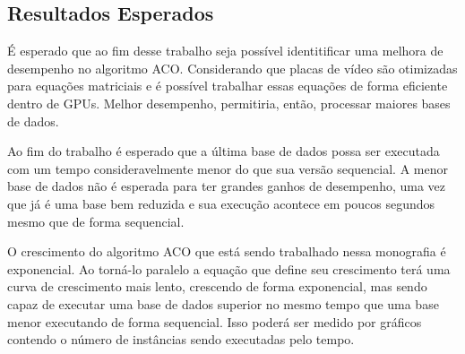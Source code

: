 \subsection{Resultados Esperados} \label{resultadosEsperados}

É esperado que ao fim desse trabalho seja possível identitificar uma melhora de desempenho
no algoritmo ACO. Considerando que placas de vídeo são otimizadas para equações matriciais e
é possível trabalhar essas equações de forma eficiente dentro de GPUs. Melhor desempenho,
permitiria, então, processar maiores bases de dados.

Ao fim do trabalho é esperado que a última base de dados possa ser executada com um tempo
consideravelmente menor do que sua versão sequencial. A menor base de dados não é esperada
para ter grandes ganhos de desempenho, uma vez que já é uma base bem reduzida e sua execução
acontece em poucos segundos mesmo que de forma sequencial.

O crescimento do algoritmo ACO que está sendo trabalhado nessa monografia é exponencial.
Ao torná-lo paralelo a equação que define seu crescimento terá uma curva de crescimento mais lento,
crescendo de forma exponencial, mas sendo capaz de executar uma base de dados superior no mesmo tempo
que uma base menor executando de forma sequencial. Isso poderá ser medido por gráficos contendo
o número de instâncias sendo executadas pelo tempo.
